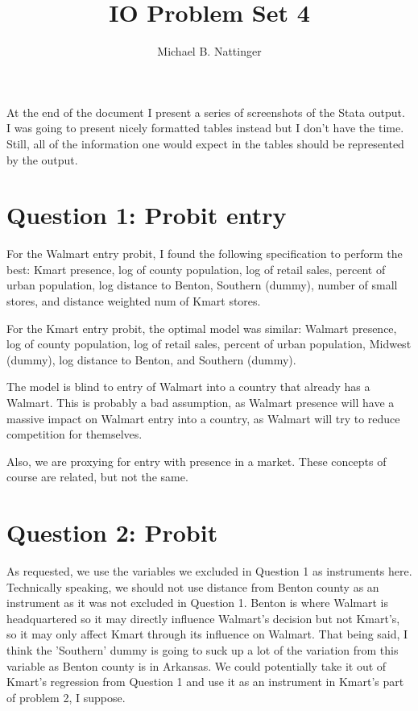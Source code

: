 \documentclass[11pt]{article} %
\title{IO Problem Set 4}
\author{Michael B. Nattinger}
\begin{document}
\maketitle

At the end of the document I present a series of screenshots of the Stata output. I was going to present nicely formatted tables instead but I don't have the time. Still, all of the information one would expect in the tables should be represented by the output.


\section{Question 1: Probit entry}

For the Walmart entry probit, I found the following specification to perform the best: Kmart presence, log of county population, log of retail sales, percent of urban population, log distance to Benton, Southern (dummy), number of small stores, and distance weighted num of Kmart stores.

For the Kmart entry probit, the optimal model was similar: Walmart presence, log of county population, log of retail sales, percent of urban population, Midwest (dummy), log distance to Benton, and Southern (dummy).

The model is blind to entry of Walmart into a country that already has a Walmart. This is probably a bad assumption, as Walmart presence will have a massive impact on Walmart entry into a country, as Walmart will try to reduce competition for themselves.

Also, we are proxying for entry with presence in a market. These concepts of course are related, but not the same.

\section{Question 2: Probit}
As requested, we use the variables we excluded in Question 1 as instruments here. Technically speaking, we should not use distance from Benton county as an instrument as it was not excluded in Question 1. Benton is where Walmart is headquartered so it may directly influence Walmart's decision but not Kmart's, so it may only affect Kmart through its influence on Walmart. That being said, I think the 'Southern' dummy is going to suck up a lot of the variation from this variable as Benton county is in Arkansas. We could potentially take it out of Kmart's regression from Question 1 and use it as an instrument in Kmart's part of problem 2, I suppose.
\end{document}
